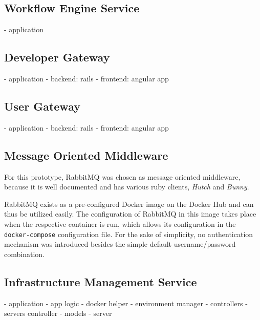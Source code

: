   \subsection{Workflow Engine Service} %
    \label{sub:workflow_engine_service}
      - application

  \subsection{Developer Gateway} %
    \label{sub:developer_gateway}
      - application
        - backend: rails
        - frontend: angular app

  \subsection{User Gateway} %
    \label{sub:user_gateway}
      - application
        - backend: rails
        - frontend: angular app

  \subsection{Message Oriented Middleware} %
    \label{sub:message_oriented_middleware}
      For this prototype, RabbitMQ was chosen as message oriented middleware, because it is well documented and has various ruby clients, \eg \emph{Hutch} and \emph{Bunny}.

      RabbitMQ exists as a pre-configured Docker image on the Docker Hub and can thus be utilized easily. The configuration of RabbitMQ in this image takes place when the respective container is run, which allows its configuration in the \texttt{docker-compose} configuration file.
      For the sake of simplicity, no authentication mechanism was introduced besides the simple default username/password combination.

  \subsection{Infrastructure Management Service} %
    \label{sub:infrastructure_management_service}
      - application
        - app logic
          - docker helper
          - environment manager
        - controllers
          - servers controller
        - models
          - server

